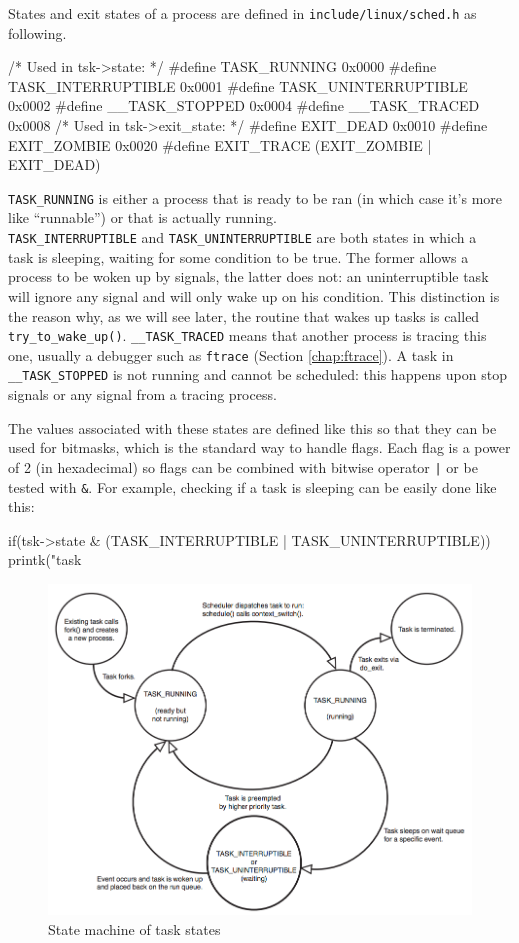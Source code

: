 \documentclass[10pt]{book}
\begin{document}
States and exit states of a process are defined in \verb|include/linux/sched.h| as following.
\begin{code}
/* Used in tsk->state: */
#define TASK_RUNNING    0x0000
#define TASK_INTERRUPTIBLE  0x0001
#define TASK_UNINTERRUPTIBLE    0x0002
#define __TASK_STOPPED			0x0004
#define __TASK_TRACED			0x0008
/* Used in tsk->exit_state: */
#define EXIT_DEAD   0x0010
#define EXIT_ZOMBIE 0x0020
#define EXIT_TRACE  (EXIT_ZOMBIE | EXIT_DEAD)
\end{code}
\verb|TASK_RUNNING| is either a process that is ready to be ran (in which case it's more like ``runnable'') or that is actually running. \\
\verb|TASK_INTERRUPTIBLE| and \verb|TASK_UNINTERRUPTIBLE| are both states in which a\\task is sleeping, waiting for some condition to be true. The former allows a process to be woken up by signals, the latter does not: an uninterruptible task will ignore any signal and will only wake up on his condition. This distinction is the reason why, as we will see later, the routine that wakes up tasks is called \verb|try_to_wake_up()|. \verb|__TASK_TRACED| means that another process is tracing this one, usually a debugger such as \verb|ftrace| (Section \ref{chap:ftrace}). A task in \verb|__TASK_STOPPED| is not running and cannot be scheduled: this happens upon stop signals or any signal from a tracing process.

The values associated with these states are defined like this so that they can be used for bitmasks, which is the standard way to handle flags. Each flag is a power of 2 (in hexadecimal) so flags can be combined with bitwise operator \verb&|& or be tested with \verb|&|. For example, checking if a task is sleeping can be easily done like this: 
\begin{code}
if(tsk->state & (TASK_INTERRUPTIBLE | TASK_UNINTERRUPTIBLE))
    printk("task %
\end{code}

\begin{figure}[ht]
\includegraphics[width=\textwidth]{process_life} %
\caption{State machine of task states}
\label{img:process_life}
\end{figure}
\end{document}
